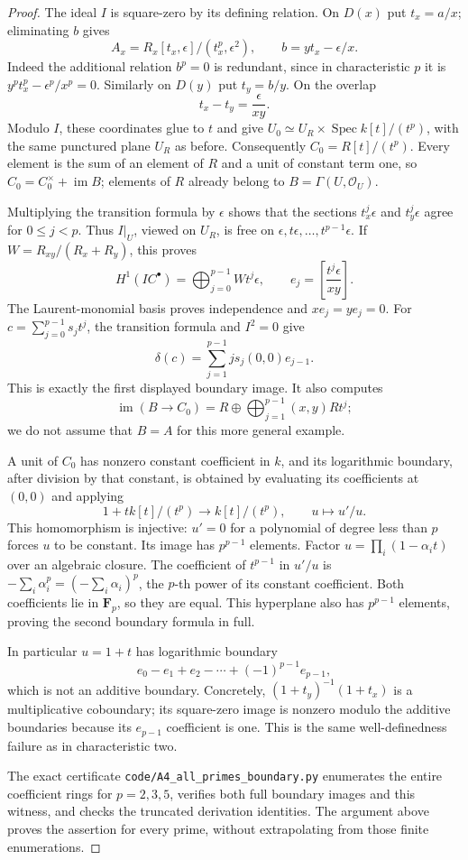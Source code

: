 \begin{proof}
The ideal $I$ is square-zero by its defining relation.  On $D(x)$ put
$t_x=a/x$; eliminating $b$ gives
\[
 A_x=R_x[t_x,\epsilon]/(t_x^p,\epsilon^2),\qquad
 b=yt_x-\epsilon/x.
\]
Indeed the additional relation $b^p=0$ is redundant, since in
characteristic $p$ it is $y^pt_x^p-\epsilon^p/x^p=0$.
Similarly on $D(y)$ put $t_y=b/y$.  On the overlap
\[
                t_x-t_y=\frac{\epsilon}{xy}.
\]
Modulo $I$, these coordinates glue to $t$ and give
$U_0\simeq U_R\times\operatorname{Spec}k[t]/(t^p)$, with the same
punctured plane $U_R$ as before.  Consequently
$C_0=R[t]/(t^p)$.  Every element is the sum of an element of $R$ and
a unit of constant term one, so $C_0=C_0^\times+\operatorname{im}B$;
elements of $R$ already belong to $B=\Gamma(U,\mathcal O_U)$.

Multiplying the transition formula by $\epsilon$ shows that the
sections $t_x^j\epsilon$ and $t_y^j\epsilon$ agree for $0\leq j<p$.
Thus $I|_U$, viewed on $U_R$, is free on
$\epsilon,t\epsilon,\ldots,t^{p-1}\epsilon$.  If
$W=R_{xy}/(R_x+R_y)$, this proves
\[
 H^1(IC^\bullet)=\bigoplus_{j=0}^{p-1}W t^j\epsilon,
 \qquad e_j=\left[\frac{t^j\epsilon}{xy}\right].
\]
The Laurent-monomial basis proves independence and $x e_j=y e_j=0$.
For $c=\sum_{j=0}^{p-1}s_jt^j$, the transition formula and $I^2=0$ give
\[
 \delta(c)=\sum_{j=1}^{p-1}j s_j(0,0)e_{j-1}.
\]
This is exactly the first displayed boundary image.  It also computes
\[
 \operatorname{im}(B\to C_0)
     =R\oplus\bigoplus_{j=1}^{p-1}(x,y)R t^j;
\]
we do not assume that $B=A$ for this more general example.

A unit of $C_0$ has nonzero constant coefficient in $k$, and its
logarithmic boundary, after division by that constant, is obtained by
evaluating its coefficients at $(0,0)$ and applying
\[
 1+t k[t]/(t^p)\longrightarrow k[t]/(t^p),
                    \qquad u\longmapsto u'/u.
\]
This homomorphism is injective: $u'=0$ for a polynomial of degree less
than $p$ forces $u$ to be constant.  Its image has $p^{p-1}$ elements.
Factor $u=\prod_i(1-\alpha_i t)$ over an algebraic closure.  The
coefficient of $t^{p-1}$ in $u'/u$ is
$-\sum_i\alpha_i^p=(-\sum_i\alpha_i)^p$, the $p$-th power of its
constant coefficient.  Both coefficients lie in $\mathbf F_p$, so
they are equal.  This hyperplane also has $p^{p-1}$ elements, proving
the second boundary formula in full.

In particular $u=1+t$ has logarithmic boundary
\[
                 e_0-e_1+e_2-\cdots+(-1)^{p-1}e_{p-1},
\]
which is not an additive boundary.  Concretely,
$(1+t_y)^{-1}(1+t_x)$ is a multiplicative coboundary; its square-zero
image is nonzero modulo the additive boundaries because its
$e_{p-1}$ coefficient is one.  This is the same well-definedness
failure as in characteristic two.

The exact certificate \texttt{code/A4\_all\_primes\_boundary.py}
enumerates the entire coefficient rings for $p=2,3,5$, verifies both
full boundary images and this witness, and checks the truncated
derivation identities.  The argument above proves the assertion for
every prime, without extrapolating from those finite enumerations.
\end{proof}


